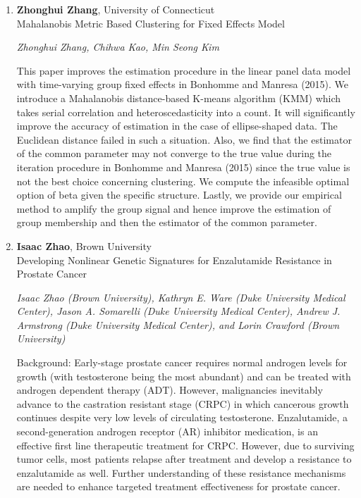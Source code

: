 \begin{enumerate}
\item \textbf{Zhonghui Zhang}, University of Connecticut \\
Mahalanobis Metric Based Clustering for Fixed Effects Model

\emph{\footnotesize Zhonghui Zhang, Chihwa Kao, Min Seong Kim}

This paper improves the estimation procedure in the linear panel data model with time-varying group fixed effects in Bonhomme and Manresa (2015). We introduce a Mahalanobis distance-based K-means algorithm (KMM) which takes serial correlation and heteroscedasticity into a count. It will significantly improve the accuracy of estimation in the case of ellipse-shaped data. The Euclidean distance failed in such a situation. Also, we find that the estimator of the common parameter may not converge to the true value during the iteration procedure in Bonhomme and Manresa (2015) since the true value is not the best choice concerning clustering. We compute the infeasible optimal option of beta given the specific structure. Lastly, we provide our empirical method to amplify the group signal and hence improve the estimation of group membership and then the estimator of the common parameter.

\item \textbf{Isaac Zhao}, Brown University \\
Developing Nonlinear Genetic Signatures for Enzalutamide Resistance in Prostate Cancer

\emph{\footnotesize Isaac Zhao (Brown University), Kathryn E. Ware (Duke University Medical Center), Jason A. Somarelli (Duke University Medical Center), Andrew J. Armstrong (Duke University Medical Center), and Lorin Crawford (Brown University)}

Background: Early-stage prostate cancer requires normal androgen levels for growth (with testosterone
being the most abundant) and can be treated with androgen dependent therapy (ADT).
However, malignancies inevitably advance to the castration resistant stage (CRPC) in which cancerous
growth continues despite very low levels of circulating testosterone. Enzalutamide, a second-generation
androgen receptor (AR) inhibitor medication, is an effective first line therapeutic treatment for
CRPC. However, due to surviving tumor cells, most patients relapse after treatment and develop a
resistance to enzalutamide as well. Further understanding of these resistance mechanisms are needed
to enhance targeted treatment effectiveness for prostate cancer.


\end{enumerate}
